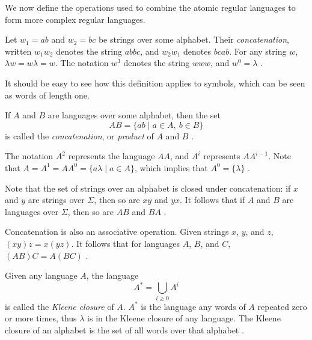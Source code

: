 \documentclass{bcthesis}
\renewcommand{\meo}[1]{}
\newcommand{\footcite}[2]{\xspace\cite[pg.~{#2}]{#1}\xspace}
\begin{document}
	We now define the operations used to combine the atomic regular languages to form more complex regular languages.

	\begin{definition}[Concatenation]
		Let $w_1 = ab$ and $w_2 = bc$ be strings over some alphabet.
		Their \textit{concatenation}, written $w_1 w_2$ denotes the string $abbc$, and $w_2 w_1$ denotes $bcab$.
		For any string $w$, $\lambda w = w \lambda = w$.
		The notation $w^3$ denotes the string $www$, and $w^0 = \lambda$ \footcite{salomaa}{1}.

		It should be easy to see how this definition applies to symbols, which can be seen as words of length one.
	\end{definition}

	\begin{definition}
		If $A$ and $B$ are languages over some alphabet, then the set
		\[
			AB = \{ ab \mid a \in A, \ b \in B \}
		\]
		is called the \textit{concatenation}, or \textit{product} of $A$ and $B$ \footcite{lemmings}{3}.

		The notation $A^2$ represents the language $AA$, and $A^i$ represents $AA^{i-1}$.
		Note that $A = A^1 = AA^0 = \{ a \lambda \mid a \in A \}$, which implies that $A^0 = \{ \lambda \}$ \footcite{lemmings}{3}.
	\end{definition}

	\begin{remark}
		Note that the set of strings over an alphabet is closed under concatenation: if $x$ and $y$ are strings over $\Sigma$, then so are $xy$ and $yx$.
		It follows that if $A$ and $B$ are languages over $\Sigma$, then so are $AB$ and $BA$ \footcite{lemmings}{2}.
		
		Concatenation is also an associative operation.
		Given strings $x$, $y$, and $z$, $(xy)z = x(yz)$.
		It follows that for languages $A$, $B$, and $C$, ${(AB)C = A(BC)}$ \footcite{lemmings}{2}.

		\meo{
			Maybe also note that length has the properties of the logarithm with regard to concatenation.
			It's a curiosity, but not really useful information
		}

	\end{remark}

	\begin{definition}
		Given any language $A$, the language 
		\[
			A^* = \bigcup_{i \geq 0} A^i
		\]
		is called the \textit{Kleene closure} of $A$.
		$A^*$ is the language any words of $A$ repeated zero or more times, thus $\lambda$ is in the Kleene closure of any language.
		The Kleene closure of an alphabet is the set of all words over that alphabet \footcite{lemmings}{3}.
	\end{definition}
\end{document}
